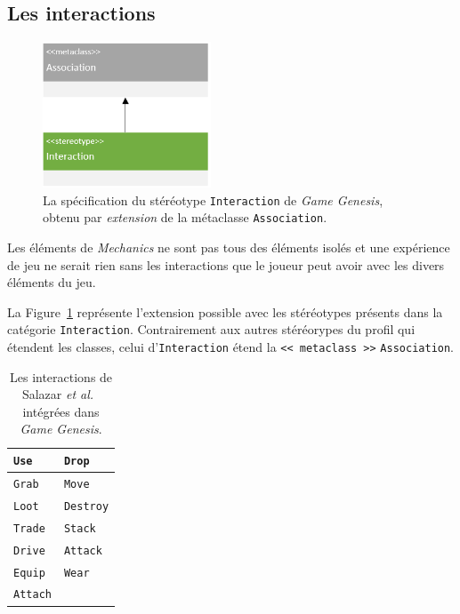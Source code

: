 \subsection{Les interactions}

\begin{figure}
    \centering
    \includegraphics[width=5cm]{10_img/chap5/metaclass_association.PNG} 
    \caption{La spécification du stéréotype \texttt{Interaction} de \emph{Game Genesis}, obtenu par \emph{extension} de la m\'etaclasse \texttt{Association}.}
    \label{fig.meta_assoc}
\end{figure}

Les éléments de \emph{Mechanics} ne sont pas tous des éléments isolés et une expérience de jeu ne serait rien sans les interactions que le joueur peut avoir avec les divers \'el\'ements du jeu.

La Figure~\ref{fig.meta_assoc} représente l'extension possible avec les stéréotypes présents dans la catégorie \texttt{Interaction}.
Contrairement aux autres stéréorypes du profil qui étendent les classes, celui d'\texttt{Interaction} étend la \texttt{<<~metaclass~>>} \texttt{Association}.

\begin{table}
\begin{center}
\begin{tabular}{|l|l|}\hline
\texttt{Use} &
\texttt{Drop}
\\\hline
\texttt{Grab} &
\texttt{Move}
\\\hline
\texttt{Loot} &
\texttt{Destroy}
\\\hline
\texttt{Trade} &
\texttt{Stack}
\\\hline
\texttt{Drive} &
\texttt{Attack}
\\\hline
\texttt{Equip} &
\texttt{Wear}
\\\hline
\texttt{Attach}&
\\\hline
\end{tabular}
\end{center}
\caption{Les interactions de Salazar \emph{et al.}~\cite{salazar_gdd} intégrées dans \emph{Game Genesis}.}
\label{table.interactions}
\end{table}


